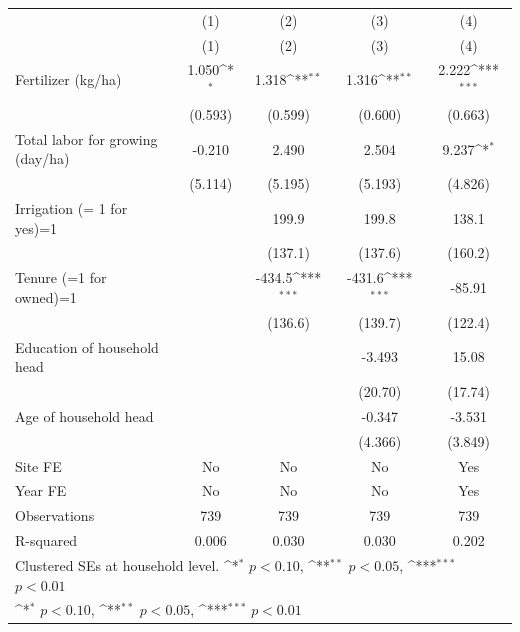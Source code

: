 {
\def\sym#1{\ifmmode^{#1}\else\(^{#1}\)\fi}
\begin{tabular}{l*{4}{c}}
\toprule
                    &\multicolumn{1}{c}{(1)}&\multicolumn{1}{c}{(2)}&\multicolumn{1}{c}{(3)}&\multicolumn{1}{c}{(4)}\\
                    &\multicolumn{1}{c}{(1)}&\multicolumn{1}{c}{(2)}&\multicolumn{1}{c}{(3)}&\multicolumn{1}{c}{(4)}\\
\midrule
Fertilizer (kg/ha)  &       1.050\sym{*}  &       1.318\sym{**} &       1.316\sym{**} &       2.222\sym{***}\\
                    &     (0.593)         &     (0.599)         &     (0.600)         &     (0.663)         \\
\addlinespace
Total labor for growing (day/ha)&      -0.210         &       2.490         &       2.504         &       9.237\sym{*}  \\
                    &     (5.114)         &     (5.195)         &     (5.193)         &     (4.826)         \\
\addlinespace
Irrigation (= 1 for yes)=1&                     &       199.9         &       199.8         &       138.1         \\
                    &                     &     (137.1)         &     (137.6)         &     (160.2)         \\
\addlinespace
Tenure (=1 for owned)=1&                     &      -434.5\sym{***}&      -431.6\sym{***}&      -85.91         \\
                    &                     &     (136.6)         &     (139.7)         &     (122.4)         \\
\addlinespace
Education of household head&                     &                     &      -3.493         &       15.08         \\
                    &                     &                     &     (20.70)         &     (17.74)         \\
\addlinespace
Age of household head&                     &                     &      -0.347         &      -3.531         \\
                    &                     &                     &     (4.366)         &     (3.849)         \\
\addlinespace
Site FE             &          No         &          No         &          No         &         Yes         \\
\addlinespace
Year FE             &          No         &          No         &          No         &         Yes         \\
\midrule
Observations        &         739         &         739         &         739         &         739         \\
R-squared           &       0.006         &       0.030         &       0.030         &       0.202         \\
\bottomrule
\multicolumn{5}{l}{\footnotesize Clustered SEs at household level. \sym{*} \(p<0.10\), \sym{**} \(p<0.05\), \sym{***} \(p<0.01\)}\\
\multicolumn{5}{l}{\footnotesize \sym{*} \(p<0.10\), \sym{**} \(p<0.05\), \sym{***} \(p<0.01\)}\\
\end{tabular}
}
